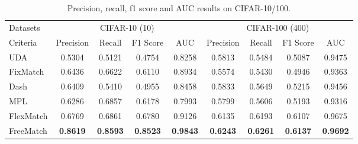 \documentclass{article} \usepackage{iclr2023_conference,times}
\theoremstyle{plain}
\theoremstyle{definition}
\theoremstyle{remark}
\begin{document}
\begin{table}[h]
\centering
\caption{Precision, recall, f1 score and AUC results on CIFAR-10/100. }
\begin{adjustbox}{width=0.7 \columnwidth,center}
\label{tb-prf1_1}
\begin{tabular}{l|cccc|cccc}
\toprule
Datasets & \multicolumn{4}{c|}{CIFAR-10 (10)} & \multicolumn{4}{c}{CIFAR-100 (400)} \\ 
\cmidrule(r){1-1} \cmidrule(lr){2-5} \cmidrule(lr){6-9} 
Criteria & \multicolumn{1}{c}{Precision}  &  \multicolumn{1}{c}{Recall}  &	\multicolumn{1}{c}{F1 Score}  &	\multicolumn{1}{c}{AUC}  & \multicolumn{1}{c}{Precision}  &  \multicolumn{1}{c}{Recall}  &	\multicolumn{1}{c}{F1 Score}  &	\multicolumn{1}{c}{AUC} \\
\cmidrule(r){1-1} \cmidrule(lr){2-5} \cmidrule(lr){6-9}

UDA &0.5304 &0.5121 &0.4754 &0.8258 &0.5813 &0.5484 &0.5087 &0.9475  \\
FixMatch  &0.6436 &0.6622 &0.6110 &0.8934 &0.5574 &0.5430 &0.4946 &0.9363 \\
Dash  &0.6409 &0.5410 &0.4955 &0.8458 &0.5833 &0.5649 &0.5215 &0.9456 \\
MPL  &0.6286 &0.6857 &0.6178 &0.7993 &0.5799 &0.5606 &0.5193 &0.9316 \\
FlexMatch  &0.6769 &0.6861 &0.6780 &0.9126 &0.6135 &0.6193 &0.6107 &0.9675 \\
FreeMatch  &\textbf{0.8619} &\textbf{0.8593} &\textbf{0.8523} &\textbf{0.9843} &\textbf{0.6243} &\textbf{0.6261} &\textbf{0.6137} & \textbf{0.9692} \\

\bottomrule
\end{tabular}
\end{adjustbox}
\end{table}
\end{document}
